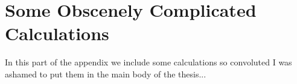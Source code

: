 \chapter{Some Obscenely Complicated Calculations}
\label{chap:convoluted}

In this part of the appendix we include some calculations so
convoluted I was ashamed to put them in the main body of the thesis...



